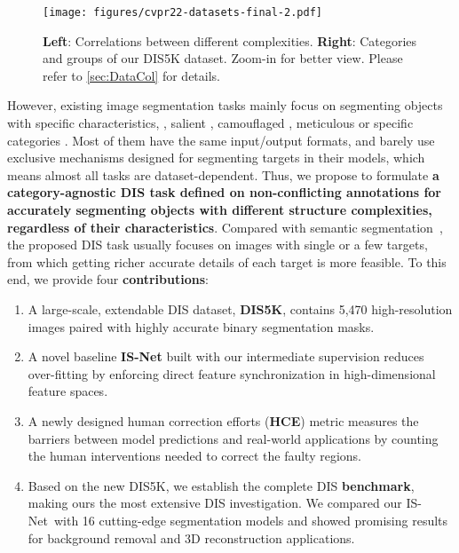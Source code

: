 \documentclass[10pt,twocolumn,letterpaper]{article}
\newcommand{\secref}[1]{\ref{#1}}
\def\ourmodel{IS-Net}
\begin{document}
\begin{figure*}[t!]
    \centering
    \texttt{[image: figures/cvpr22-datasets-final-2.pdf]}
    \vspace{-20pt}
    \caption{\small \textbf{Left}: Correlations between different complexities. \textbf{Right}: Categories and groups of our DIS5K dataset. Zoom-in for better view. Please refer to \secref{sec:DataCol} for details.}
    \label{fig:DIS-cats-grps}
    \vspace{-10pt}
\end{figure*}

However, existing image segmentation tasks mainly focus on segmenting objects 
with specific characteristics, \eg, salient \cite{wang2017learning,zeng2019towards,HRRN_ICCV2021}, camouflaged \cite{le2019anabranch,chameleon,fan2020camouflaged}, meticulous \cite{liew2021deep,yang2020meticulous} or specific categories \cite{ronneberger2015u,MnihThesis,shen2016automatic,MODNet,DBLP:journals/corr/abs-2108-11515}. Most of them have the same input/output formats, and barely use exclusive mechanisms designed for segmenting targets in their models, which means almost all tasks are dataset-dependent. 
Thus, we propose to formulate \textbf{a category-agnostic DIS task defined on non-conflicting annotations for accurately segmenting objects with different structure complexities, regardless of their characteristics}. 
Compared with semantic segmentation~\cite{everingham2010pascal,lin2014microsoft,Cordts2016Cityscapes,zhou2017scene,qi2021open}, the proposed DIS task usually focuses on images with single or a few targets, from which getting richer accurate details of each target is more feasible. To this end, we provide four \textbf{contributions}:
\begin{enumerate}
    \vspace{-3pt}
    \item 
    A large-scale, extendable DIS dataset, \textbf{DIS5K}, contains 5,470 high-resolution images paired with highly accurate binary segmentation masks.
    \vspace{-4pt}
    \item 
    A novel baseline \textbf{\ourmodel} built with our intermediate supervision reduces over-fitting by enforcing direct feature synchronization in high-dimensional feature spaces.
    \vspace{-4pt}
    \item 
    A newly designed human correction efforts (\textbf{HCE}) metric measures the barriers between model predictions and real-world applications by counting the human interventions needed to correct the faulty regions.
    \vspace{-4pt}
    \item Based on the new DIS5K, we establish the complete DIS \textbf{benchmark}, making ours the most extensive DIS investigation. We compared our \ourmodel~with 16 cutting-edge segmentation models and showed promising results for background removal and 3D reconstruction applications.
\end{enumerate}
\end{document}
